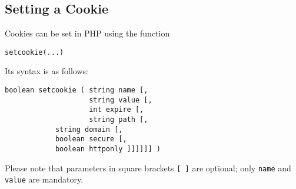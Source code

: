 \documentclass[a4paper, justified, notoc]{tufte-handout} %
\begin{document}
\subsection{Setting a Cookie} %
\label{sub:setting_a_cookie}

Cookies can be set in PHP using the function
\begin{Verbatim}
setcookie(...)
\end{Verbatim}
Its syntax is as follows:
\begin{Verbatim}
boolean setcookie ( string name [, 
                    string value [, 
                    int expire [, 
                    string path [, 
		    string domain [, 
		    boolean secure [, 
		    boolean httponly ]]]]]] )
\end{Verbatim}
Please note that parameters in square brackets \texttt{[ ]} are optional; only \texttt{name} and \texttt{value} are mandatory. 
\end{document}

